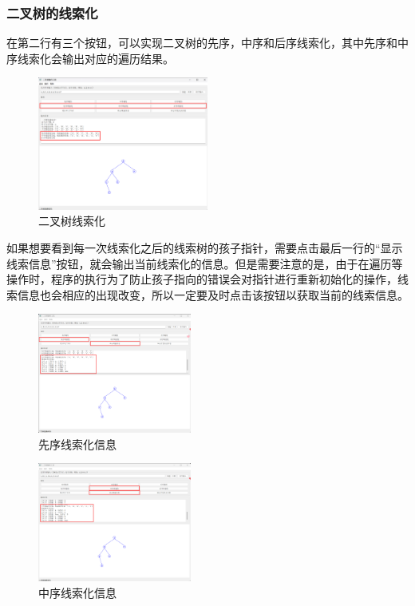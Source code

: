\documentclass[12pt,a4paper]{article}
\begin{document}
\subsubsection{二叉树的线索化}

在第二行有三个按钮，可以实现二叉树的先序，中序和后序线索化，其中先序和中序线索化会输出对应的遍历结果。

\begin{figure}[H]
    \centering
    \includegraphics[width=0.5\textwidth]{pt1-9.png}
    \caption{二叉树线索化}
\end{figure}

如果想要看到每一次线索化之后的线索树的孩子指针，需要点击最后一行的“显示线索信息”按钮，就会输出当前线索化的信息。但是需要注意的是，由于在遍历等操作时，程序的执行为了防止孩子指向的错误会对指针进行重新初始化的操作，线索信息也会相应的出现改变，所以一定要及时点击该按钮以获取当前的线索信息。

\begin{figure}[H]
    \centering
    \includegraphics[width=0.45\textwidth]{pt1-10.png}
    \caption{先序线索化信息}
\end{figure}

\begin{figure}[H]
    \centering
    \includegraphics[width=0.45\textwidth]{pt1-11.png}
    \caption{中序线索化信息}
\end{figure}
\end{document}

